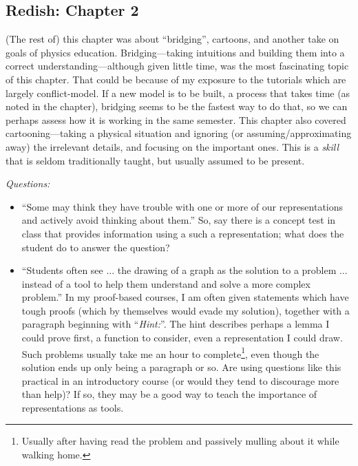 \documentclass[12pt]{article}
\begin{document}
\subsection*{Redish: Chapter 2} 
(The rest of) this chapter was about ``bridging'', cartoons, and another
take on goals of physics education.  Bridging---taking intuitions and
building them into a correct understanding---although given little time,
was the most fascinating topic of this chapter.  That could be because
of my exposure to the tutorials which are largely conflict-model.  If a
new model is to be built, a process that takes time (as noted in the
chapter), bridging seems to be the fastest way to do that, so we can
perhaps assess how it is working in the same semester.  This chapter
also covered cartooning---taking a physical situation and ignoring (or
assuming/approximating away) the irrelevant details, and focusing on the
important ones.  This is a \textit{skill} that is seldom traditionally
taught, but usually assumed to be present.

\textit{Questions:}
\begin{itemize}
\item ``Some may think they have trouble with one or more of our
representations and actively avoid thinking about them.''  So, say there
is a concept test in class that provides information using a such a
representation; what does the student do to answer the question?
\item ``Students often see ... the drawing of a graph as the solution to
a problem ... instead of a tool to help them understand and solve a more
complex problem.''  In my proof-based courses, I am often given
statements which have tough proofs (which by themselves would evade my
solution), together with a paragraph beginning with ``\textit{Hint:}''.
The hint describes perhaps a lemma I could prove first, a function to
consider, even a representation I could draw.  Such problems usually
take me an hour to complete\footnote{Usually after having read the
problem and passively mulling about it while walking home.}, even though
the solution ends up only being a paragraph or so.  Are using questions
like this practical in an introductory course (or would they tend to
discourage more than help)?  If so, they may be a good way to teach the
importance of representations as tools.
\end{itemize}
\end{document}
